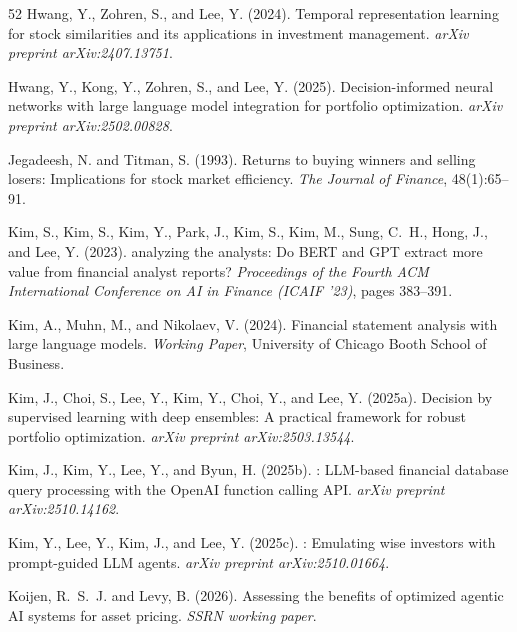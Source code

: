 {\begin{thebibliography}{52}
Hwang, Y., Zohren, S., and Lee, Y. (2024).
\newblock Temporal representation learning for stock similarities and its applications in investment management.
\newblock \emph{arXiv preprint arXiv:2407.13751}.

Hwang, Y., Kong, Y., Zohren, S., and Lee, Y. (2025).
\newblock Decision-informed neural networks with large language model integration for portfolio optimization.
\newblock \emph{arXiv preprint arXiv:2502.00828}.

Jegadeesh, N. and Titman, S. (1993).
\newblock Returns to buying winners and selling losers: Implications for stock market efficiency.
\newblock \emph{The Journal of Finance}, 48(1):65--91.

Kim, S., Kim, S., Kim, Y., Park, J., Kim, S., Kim, M., Sung, C.~H., Hong, J., and Lee, Y. (2023).
 analyzing the analysts: Do {BERT} and {GPT} extract more value from financial analyst reports?
\newblock \emph{Proceedings of the Fourth ACM International Conference on AI in Finance (ICAIF '23)}, pages 383--391.

Kim, A., Muhn, M., and Nikolaev, V. (2024).
\newblock Financial statement analysis with large language models.
\newblock \emph{Working Paper}, University of Chicago Booth School of Business.

Kim, J., Choi, S., Lee, Y., Kim, Y., Choi, Y., and Lee, Y. (2025a).
\newblock Decision by supervised learning with deep ensembles: A practical framework for robust portfolio optimization.
\newblock \emph{arXiv preprint arXiv:2503.13544}.

Kim, J., Kim, Y., Lee, Y., and Byun, H. (2025b).
: {LLM}-based financial database query processing with the {OpenAI} function calling {API}.
\newblock \emph{arXiv preprint arXiv:2510.14162}.

Kim, Y., Lee, Y., Kim, J., and Lee, Y. (2025c).
: Emulating wise investors with prompt-guided {LLM} agents.
\newblock \emph{arXiv preprint arXiv:2510.01664}.

Koijen, R.~S.~J. and Levy, B. (2026).
\newblock Assessing the benefits of optimized agentic {AI} systems for asset pricing.
\newblock \emph{SSRN working paper}.


\end{thebibliography}}
